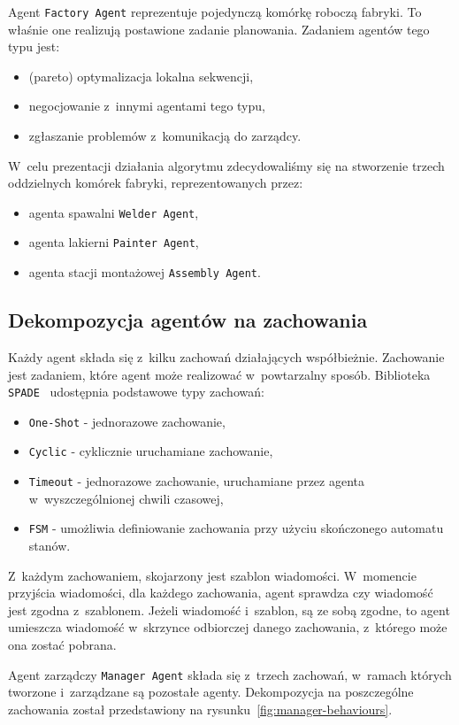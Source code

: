 Agent \texttt{Factory Agent} reprezentuje pojedynczą komórkę roboczą fabryki. To właśnie one realizują postawione zadanie planowania. Zadaniem agentów tego typu jest:
\begin{itemize}
    \item (pareto) optymalizacja lokalna sekwencji,
    \item negocjowanie z~innymi agentami tego typu,
    \item zgłaszanie problemów z~komunikacją do zarządcy.
\end{itemize}

W~celu prezentacji działania algorytmu zdecydowaliśmy się na stworzenie trzech oddzielnych komórek fabryki, reprezentowanych przez:
\begin{itemize}
    \item agenta spawalni \texttt{Welder Agent},
    \item agenta lakierni \texttt{Painter Agent},
    \item agenta stacji montażowej \texttt{Assembly Agent}.
\end{itemize}

\subsection{Dekompozycja agentów na zachowania}
Każdy agent składa się z~kilku zachowań działających współbieżnie. Zachowanie jest zadaniem, które agent może realizować w~powtarzalny sposób. Biblioteka \texttt{SPADE}~\cite{spade} udostępnia podstawowe typy zachowań:
\begin{itemize}
    \item \texttt{One-Shot} - jednorazowe zachowanie,
    \item \texttt{Cyclic} - cyklicznie uruchamiane zachowanie,
    \item \texttt{Timeout} - jednorazowe zachowanie, uruchamiane przez agenta w~wyszczególnionej chwili czasowej,
    \item \texttt{FSM} - umożliwia definiowanie zachowania przy użyciu skończonego automatu stanów.
\end{itemize}

Z~każdym zachowaniem, skojarzony jest szablon wiadomości. W~momencie przyjścia wiadomości, dla każdego zachowania, agent sprawdza czy wiadomość jest zgodna z~szablonem. Jeżeli wiadomość i~szablon, są ze sobą zgodne, to agent umieszcza wiadomość w~skrzynce odbiorczej danego zachowania, z~którego może ona zostać pobrana. 

Agent zarządczy \texttt{Manager Agent} składa się z~trzech zachowań, w~ramach których tworzone i~zarządzane są pozostałe agenty. Dekompozycja na poszczególne zachowania został przedstawiony na rysunku~\ref{fig:manager-behaviours}.

